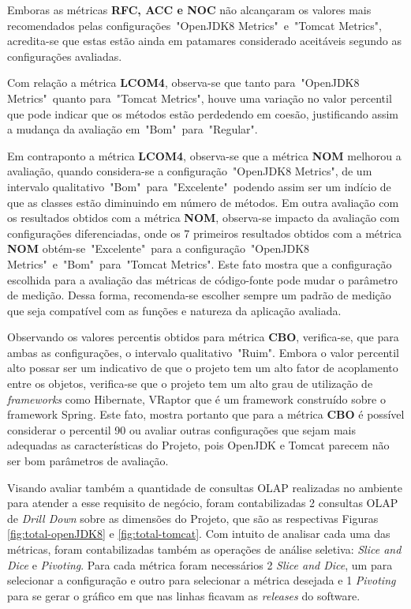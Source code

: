 Emboras as métricas \textbf{RFC, ACC e NOC} não alcançaram os valores mais recomendados pelas configurações~"OpenJDK8 Metrics"~e~"Tomcat Metrics", acredita-se que estas estão ainda em patamares considerado aceitáveis segundo as configurações avaliadas. 

Com relação a métrica \textbf{LCOM4}, observa-se que tanto para~"OpenJDK8 Metrics"~quanto para~"Tomcat Metrics", houve uma variação no valor percentil que pode indicar que os métodos estão perdedendo em coesão, justificando assim a mudança da avaliação em~"Bom"~para~"Regular".

Em contraponto a métrica \textbf{LCOM4}, observa-se que a métrica \textbf{NOM} melhorou a avaliação, quando considera-se a configuração~"OpenJDK8 Metrics", de um intervalo qualitativo~"Bom"~para~"Excelente"~podendo assim ser um indício de que as classes estão diminuindo em número de métodos. Em outra avaliação com os resultados obtidos com a métrica \textbf{NOM}, observa-se impacto da avaliação com configurações diferenciadas, onde  os 7 primeiros resultados obtidos com a métrica \textbf{NOM} obtém-se~"Excelente"~para a configuração~"OpenJDK8 Metrics"~e~"Bom"~para~"Tomcat Metrics". Este fato mostra que a configuração escolhida para a avaliação das métricas de código-fonte pode mudar o parâmetro de medição. Dessa forma, recomenda-se escolher sempre um padrão de medição que seja compatível com as funções e natureza da aplicação avaliada.


Observando os valores percentis obtidos para métrica \textbf{CBO}, verifica-se, que para ambas as configurações, o intervalo qualitativo~"Ruim". Embora o valor percentil alto possar ser um indicativo de que o projeto tem um alto fator de acoplamento entre os objetos, verifica-se que o projeto tem um alto grau de utilização de \textit{frameworks} como Hibernate, VRaptor que é um framework construído sobre o framework Spring. Este fato, mostra portanto que para a métrica \textbf{CBO} é possível considerar o percentil 90 ou avaliar outras configurações que sejam mais adequadas as características do Projeto, pois OpenJDK e Tomcat parecem não ser bom parâmetros de avaliação.  


Visando avaliar também a quantidade de consultas OLAP realizadas no ambiente para atender a esse requisito de negócio, foram contabilizadas 2 consultas OLAP de \textit{Drill Down} sobre as dimensões do Projeto, que são as respectivas Figuras \ref{fig:total-openJDK8} e \ref{fig:total-tomcat}. Com intuito de analisar cada uma das métricas, foram contabilizadas também as operações de análise seletiva: \textit{Slice and Dice} e \textit{Pivoting}. Para cada métrica foram necessários 2 \textit{Slice and Dice}, um para selecionar a configuração e outro para selecionar a métrica desejada e 1 \textit{Pivoting} para se gerar o gráfico em que nas linhas ficavam as \textit{releases} do software.  
 

